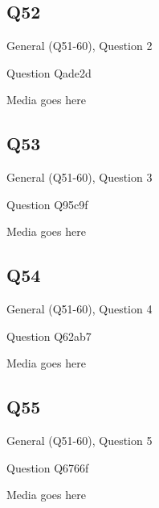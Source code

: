 \documentclass[11pt]{beamer}
\begin{document}
\subsection*{Q52}
\begin{frame}[t]{General (Q51-60), Question 2}
\vspace{2em}
\begin{block}{Question}
Qade2d
\end{block}
\begin{center}
Media goes here
\end{center}
\end{frame}
    

\subsection*{Q53}
\begin{frame}[t]{General (Q51-60), Question 3}
\vspace{2em}
\begin{block}{Question}
Q95c9f
\end{block}
\begin{center}
Media goes here
\end{center}
\end{frame}
    

\subsection*{Q54}
\begin{frame}[t]{General (Q51-60), Question 4}
\vspace{2em}
\begin{block}{Question}
Q62ab7
\end{block}
\begin{center}
Media goes here
\end{center}
\end{frame}
    

\subsection*{Q55}
\begin{frame}[t]{General (Q51-60), Question 5}
\vspace{2em}
\begin{block}{Question}
Q6766f
\end{block}
\begin{center}
Media goes here
\end{center}
\end{frame}
    
\end{document}
